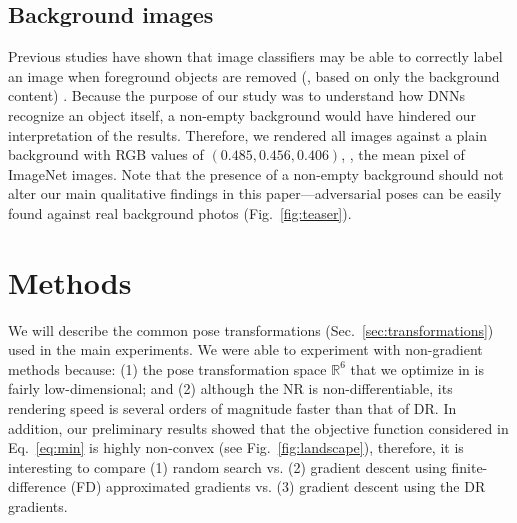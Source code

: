 \documentclass[10pt,twocolumn,letterpaper]{article}
\newcommand{\R}{\mathbb{R}}
\begin{document}
\subsection{Background images}

Previous studies have shown that image classifiers may be able to correctly label an image when foreground objects are removed (\ie, based on only the background content) \cite{zhu2016object}.
Because the purpose of our study was to understand how DNNs recognize an object itself, a non-empty background would have hindered our interpretation of the results.
Therefore, we rendered all images against a plain background with RGB values of $(0.485, 0.456, 0.406)$, \ie, the mean pixel of ImageNet images.
Note that the presence of a non-empty background should not alter our main qualitative findings in this paper---adversarial poses can be easily found against real background photos (Fig.~\ref{fig:teaser}).



\section{Methods}
\label{sec:methods}


We will describe the common pose transformations  (Sec.~\ref{sec:transformations}) used in the main experiments.
We were able to experiment with non-gradient methods because: (1) the pose transformation space $\R^6$ that we optimize in is fairly low-dimensional; and (2) although the NR is non-differentiable, its rendering speed is several orders of magnitude faster than that of DR.
In addition, our preliminary results showed that the objective function considered in Eq.~\ref{eq:min} is highly non-convex (see Fig.~\ref{fig:landscape}), therefore, it is interesting to compare (1) random search vs. (2) gradient descent using finite-difference (FD) approximated gradients vs. (3) gradient descent using the DR gradients.
\end{document}
